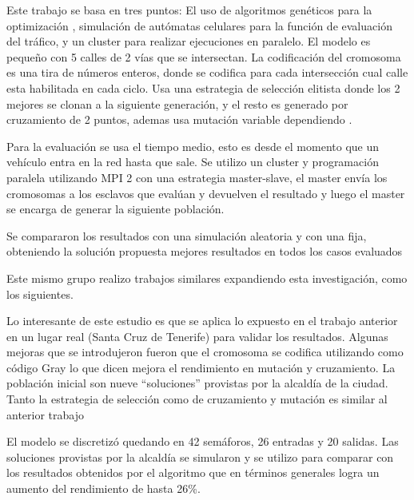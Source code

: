 \begin{itemize}
	\begin{item}
		
		Este trabajo se basa en tres puntos: El uso de algoritmos genéticos para la optimización , simulación de autómatas celulares para la función de evaluación del tráfico, y un cluster para realizar ejecuciones en paralelo.
		El modelo es pequeño con 5 calles de 2 vías que se intersectan.
		La codificación del cromosoma es una tira de números enteros, donde se codifica para cada intersección cual calle esta habilitada en cada ciclo.
		Usa una estrategia de selección elitista donde los 2 mejores se clonan a la siguiente generación, y el resto es generado por cruzamiento de 2 puntos, ademas usa mutación variable dependiendo .
		
		Para la evaluación se usa el tiempo medio, esto es desde el momento que un vehículo entra en la red hasta que sale. Se utilizo un cluster y programación paralela utilizando MPI 2 con una estrategia master-slave, el master envía los cromosomas a los esclavos que evalúan y devuelven el resultado y luego el master se encarga de generar la siguiente población.
		
		Se compararon los resultados con una simulación aleatoria y con una fija, obteniendo la solución propuesta mejores resultados en todos los casos evaluados
		
		Este mismo grupo realizo trabajos similares expandiendo esta investigación, como los siguientes.
	\end{item}

	\begin{item}
		\bibentry{Sanchez2008}
Lo interesante de este estudio es que se aplica lo expuesto en el trabajo anterior en un lugar real (Santa Cruz de Tenerife) para validar los resultados.
Algunas mejoras que se introdujeron fueron que el cromosoma se codifica utilizando como código Gray lo que dicen mejora el rendimiento en mutación y cruzamiento. La población inicial son nueve “soluciones” provistas por la alcaldía de la ciudad. Tanto la estrategia de selección como de cruzamiento y mutación  es similar al anterior trabajo

El modelo se discretizó quedando en 42 semáforos, 26 entradas y 20 salidas.
Las soluciones provistas por la alcaldía se simularon y se utilizo para comparar con los resultados obtenidos por el algoritmo que en términos generales logra un aumento del rendimiento de hasta 26\%.

	\end{item}


\end{itemize}
